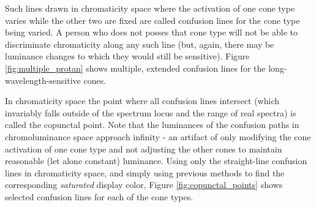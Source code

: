 \documentclass[twocolumn]{article}
\newif\ifinvert
\begin{document}
Such lines drawn in chromaticity space where the activation of one cone type varies while the other two are fixed are called confusion lines for the cone type being varied.  A person who does not posses that cone type will not be able to discriminate chromaticity along any such line (but, again, there may be luminance changes to which they would still be sensitive).  Figure \ref{fig:multiple_protan} shows multiple, extended confusion lines for the long-wavelength-sensitive cones.\\
\begin{figure*}[h]
    \ifinvert
        
    \else
        
    \fi
    \caption{Multiple protanope (missing long-wavelength-sensitive cone) confusion lines plotted in chromaticity (left) and chromoluminance (right).  The point where the chromaticity lines intersect - the copunctal point - is annotated in the left panel.  Note that in chromoluminance space the confusion line paths approach infinite luminance asymptotically as chromaticity goes toward the copunctal point.  IMAGE LINK, CODE LINK}\label{fig:multiple_protan}
\end{figure*}

In chromaticity space the point where all confusion lines intersect (which invariably falls outside of the spectrum locus and the range of real spectra) is called the copunctal point.  Note that the luminances of the confusion paths in chromoluminance space approach infinity - an artifact of only modifying the cone activation of one cone type and not adjusting the other cones to maintain reasonable (let alone constant) luminance.  Using only the straight-line confusion lines in chromaticity space, and simply using previous methods to find the corresponding \textit{saturated} display color, Figure \ref{fig:copunctal_points} shows selected confusion lines for each of the cone types.
\begin{figure*}[h]
    \ifinvert
        
    \else
        
    \fi
    \caption{Select confusion lines converging on annotated copunctal points for (from left-to-right) the long-, medium-, and short-wavelength sensitive cones (protanope, deuteranope, and tritanope, respectively).  Horizontal bands of color each show a range of saturated colors whose chromaticities would be indistinguishable to someone missing that cone (though being saturated colors, luminance variation would be detectable).  IMAGE LINK, CODE LINK}\label{fig:copunctal_points}
\end{figure*}
\end{document}
